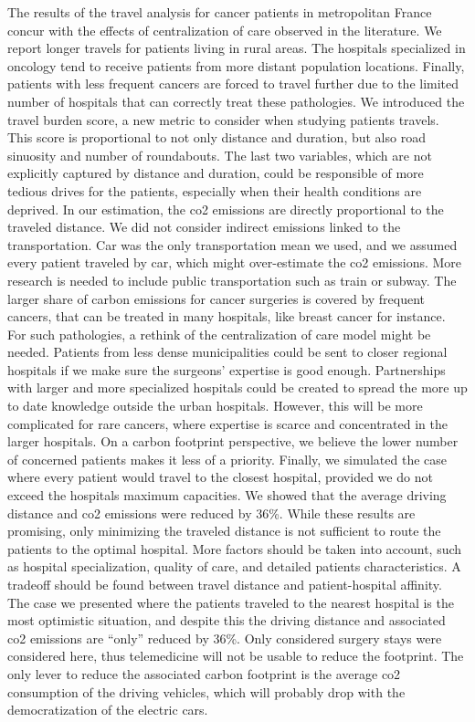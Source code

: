 The results of the travel analysis for cancer patients in metropolitan France
concur with the effects of centralization of care observed in the literature.
We report longer travels for patients living in rural areas. The hospitals
specialized in oncology tend to receive patients from more distant population
locations. Finally, patients with less frequent cancers are forced to travel
further due to the limited number of hospitals that can correctly treat these
pathologies. We introduced the travel burden score, a new metric to consider
when studying patients travels. This score is proportional to not only distance
and duration, but also road sinuosity and number of roundabouts. The last two
variables, which are not explicitly captured by distance and duration, could be
responsible of more tedious drives for the patients, especially when their
health conditions are deprived. In our estimation, the \ac{co2} emissions are
directly proportional to the traveled distance. We did not consider indirect
emissions linked to the transportation. Car was the only transportation mean we
used, and we assumed every patient traveled by car, which might over-estimate
the \ac{co2} emissions. More research is needed to include public transportation
such as train or subway. The larger share of carbon emissions for cancer
surgeries is covered by frequent cancers, that can be treated in many hospitals,
like breast cancer for instance. For such pathologies, a rethink of the
centralization of care model might be needed. Patients from less dense
municipalities could be sent to closer regional hospitals if we make sure the
surgeons' expertise is good enough. Partnerships with larger and more
specialized hospitals could be created to spread the more up to date knowledge
outside the urban hospitals. However, this will be more complicated for rare
cancers, where expertise is scarce and concentrated in the larger hospitals. On
a carbon footprint perspective, we believe the lower number of concerned
patients makes it less of a priority. Finally, we simulated the case where
every patient would travel to the closest hospital, provided we do not
exceed the hospitals maximum capacities. We showed that the average driving
distance and \ac{co2} emissions were reduced by 36\%. While these results are
promising, only minimizing the traveled distance is not sufficient to
route the patients to the optimal hospital. More factors should be taken into
account, such as hospital specialization, quality of care, and detailed
patients characteristics. A tradeoff should be found between travel distance
and patient-hospital affinity. The case we presented where the patients
traveled to the nearest hospital is the most optimistic situation, and
despite this the driving distance and associated \ac{co2} emissions are
``only'' reduced by 36\%. Only considered surgery stays were considered here,
thus telemedicine will not be usable to reduce the footprint. The only lever
to reduce the associated carbon footprint is the average \ac{co2} consumption
of the driving vehicles, which will probably drop with the democratization of
the electric cars.
